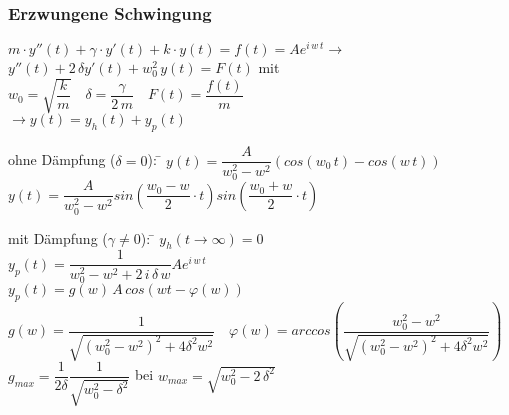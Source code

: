 \subsubsection{Erzwungene Schwingung}
$m \cdot y''(t) + \gamma\cdot y'(t) + k \cdot y(t) = f(t)=Ae^{i\,w\,t} \rightarrow$\\
$ y''(t) + 2 \, \delta y'(t) + w_0^2 \, y(t) = F(t)$ mit $w_0=\sqrt{\dfrac{k}{m}} \quad \delta=\dfrac{\gamma}{2\,m} \quad F(t)=\dfrac{f(t)}{m}$\\
$\rightarrow y(t)=y_h(t)+y_p(t)$

\begin{tabbing}
ohne Dämpfung ($\delta = 0$): \= $y(t) = \dfrac{A}{w_0^2-w^2}(cos(w_0\,t)-cos(w\,t))$\\
\> $y(t) = \dfrac{A}{w_0^2-w^2}sin(\dfrac{w_0-w}{2} \cdot t)sin(\dfrac{w_0+w}{2} \cdot t)$\\
\end{tabbing}

\begin{tabbing}
mit Dämpfung ($\gamma \neq 0$): \= $y_h(t \rightarrow \infty) = 0$\\
\> $y_p(t)= \dfrac{1}{w_0^2-w^2 + 2\,i\,\delta\,w}Ae^{i\,w\,t}$\\
\> $y_p(t)= g(w)\,A\,cos(wt-\varphi(w))$\\
\> $g(w)=\dfrac{1}{\sqrt{(w_0^2-w^2)^2+4\delta^2w^2}} \quad \varphi(w)=arccos(\dfrac{w_0^2-w^2}{\sqrt{(w_0^2-w^2)^2+4\delta^2w^2}})$\\
\> $g_{max}=\dfrac{1}{2\delta} \dfrac{1}{\sqrt{w_0^2-\delta^2}}$ bei $w_{max}=\sqrt{w_0^2-2\,\delta^2}$
\end{tabbing}

